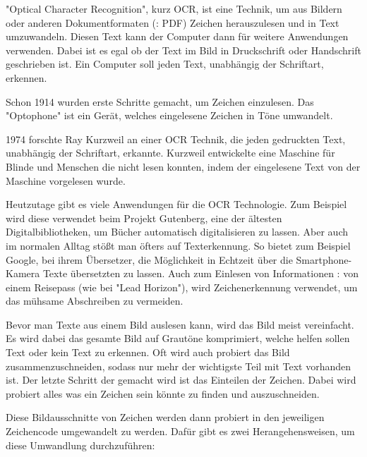 \label{sec:ocr}


"Optical Character Recognition", kurz OCR, ist eine Technik, um aus Bildern oder anderen Dokumentformaten (\zb: PDF) Zeichen herauszulesen und in Text umzuwandeln. Diesen Text kann der Computer dann für weitere Anwendungen verwenden. Dabei ist es egal ob der Text im Bild in Druckschrift oder Handschrift geschrieben ist. Ein Computer soll jeden Text, unabhängig der Schriftart, erkennen.
\cite{OCRIntro}


Schon 1914 wurden erste Schritte gemacht, um Zeichen einzulesen. Das "Optophone" ist ein Gerät, welches eingelesene Zeichen in Töne umwandelt. \cite{OCRRecognition}

1974 forschte Ray Kurzweil an einer OCR Technik, die jeden gedruckten Text, unabhängig der Schriftart, erkannte. Kurzweil entwickelte eine Maschine für Blinde und Menschen die nicht lesen konnten, indem der eingelesene Text von der Maschine vorgelesen wurde. \cite{OCRRecognition}

Heutzutage gibt es viele Anwendungen für die OCR Technologie. Zum Beispiel wird diese verwendet beim Projekt Gutenberg, eine der ältesten Digitalbibliotheken, um Bücher automatisch digitalisieren zu lassen. Aber auch im normalen Alltag stößt man öfters auf Texterkennung. So bietet zum Beispiel Google, bei ihrem Übersetzer, die Möglichkeit in Echtzeit über die Smartphone-Kamera Texte übersetzten zu lassen. Auch zum Einlesen von Informationen \zb: von einem Reisepass (wie bei "Lead Horizon"), wird Zeichenerkennung verwendet, um das mühsame Abschreiben zu vermeiden.


Bevor man Texte aus einem Bild auslesen kann, wird das Bild meist vereinfacht. Es wird dabei das gesamte Bild auf Grautöne komprimiert, welche helfen sollen Text oder kein Text zu erkennen. Oft wird auch probiert das Bild zusammenzuschneiden, sodass nur mehr der wichtigste Teil mit Text vorhanden ist. Der letzte Schritt der gemacht wird ist das Einteilen der Zeichen. Dabei wird probiert alles was ein Zeichen sein könnte zu finden und auszuschneiden. \cite{OCRPreProcessing}

Diese Bildausschnitte von Zeichen werden dann probiert in den jeweiligen Zeichencode umgewandelt zu werden. Dafür gibt es zwei Herangehensweisen, um diese Umwandlung durchzuführen:

